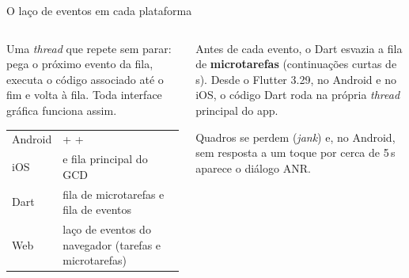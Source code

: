\begin{frame}{O laço de eventos em cada plataforma}
  \begin{columns}[T]
    \begin{column}{0.55\textwidth}
      \begin{definicao}
        Uma \emph{thread} que repete sem parar: pega o próximo evento da fila, executa o código associado até o fim e volta à fila. Toda interface gráfica funciona assim.
      \end{definicao}
      \scriptsize
      \begin{tabularx}{\linewidth}{@{}l L@{}}
        \toprule
         &  \\
        \midrule
        Android &  +  +  \\
        iOS &  e fila principal do GCD \\
        Dart & fila de microtarefas e fila de eventos \\
        Web & laço de eventos do navegador (tarefas e microtarefas) \\
        \bottomrule
      \end{tabularx}
    \end{column}
    \begin{column}{0.43\textwidth}
      \begin{pordentro}
        Antes de cada evento, o Dart esvazia a fila de \textbf{microtarefas} (continuações curtas de s). Desde o Flutter 3.29, no Android e no iOS, o código Dart roda na própria \emph{thread} principal do app.
      \end{pordentro}
      \begin{atencao}
        Quadros se perdem (\emph{jank}) e, no Android, sem resposta a um toque por cerca de 5\,s aparece o diálogo ANR.
      \end{atencao}
    \end{column}
  \end{columns}
\end{frame}

